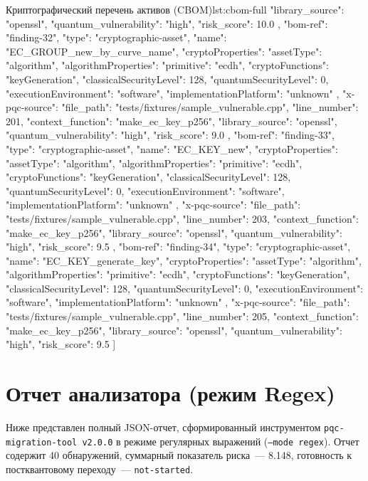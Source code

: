 \documentclass{itmo-vkr}
\begin{document}
\begin{itmolisting}[JSON]{Криптографический перечень активов (CBOM)}{lst:cbom-full}
{{{				"library_source": "openssl",
				"quantum_vulnerability": "high",
				"risk_score": 10.0
			}
		},
		{
			"bom-ref": "finding-32",
			"type": "cryptographic-asset",
			"name": "EC_GROUP_new_by_curve_name",
			"cryptoProperties": {
				"assetType": "algorithm",
				"algorithmProperties": {
					"primitive": "ecdh",
					"cryptoFunctions": "keyGeneration",
					"classicalSecurityLevel": 128,
					"quantumSecurityLevel": 0,
					"executionEnvironment": "software",
					"implementationPlatform": "unknown"
				}
			},
			"x-pqc-source": {
				"file_path": "tests/fixtures/sample_vulnerable.cpp",
				"line_number": 201,
				"context_function": "make_ec_key_p256",
				"library_source": "openssl",
				"quantum_vulnerability": "high",
				"risk_score": 9.0
			}
		},
		{
			"bom-ref": "finding-33",
			"type": "cryptographic-asset",
			"name": "EC_KEY_new",
			"cryptoProperties": {
				"assetType": "algorithm",
				"algorithmProperties": {
					"primitive": "ecdh",
					"cryptoFunctions": "keyGeneration",
					"classicalSecurityLevel": 128,
					"quantumSecurityLevel": 0,
					"executionEnvironment": "software",
					"implementationPlatform": "unknown"
				}
			},
			"x-pqc-source": {
				"file_path": "tests/fixtures/sample_vulnerable.cpp",
				"line_number": 203,
				"context_function": "make_ec_key_p256",
				"library_source": "openssl",
				"quantum_vulnerability": "high",
				"risk_score": 9.5
			}
		},
		{
			"bom-ref": "finding-34",
			"type": "cryptographic-asset",
			"name": "EC_KEY_generate_key",
			"cryptoProperties": {
				"assetType": "algorithm",
				"algorithmProperties": {
					"primitive": "ecdh",
					"cryptoFunctions": "keyGeneration",
					"classicalSecurityLevel": 128,
					"quantumSecurityLevel": 0,
					"executionEnvironment": "software",
					"implementationPlatform": "unknown"
				}
			},
			"x-pqc-source": {
				"file_path": "tests/fixtures/sample_vulnerable.cpp",
				"line_number": 205,
				"context_function": "make_ec_key_p256",
				"library_source": "openssl",
				"quantum_vulnerability": "high",
				"risk_score": 9.5
			}
		}
		]
	}
\end{itmolisting}

\section{Отчет анализатора (режим Regex)}
\label{app:report-regex}

Ниже представлен полный JSON-отчет, сформированный инструментом \texttt{pqc-migration-tool~v2.0.0} в режиме регулярных выражений (\texttt{--mode regex}). Отчет содержит 40 обнаружений, суммарный показатель риска~--- 8.148, готовность к постквантовому переходу~--- \texttt{not-started}.
\end{document}

